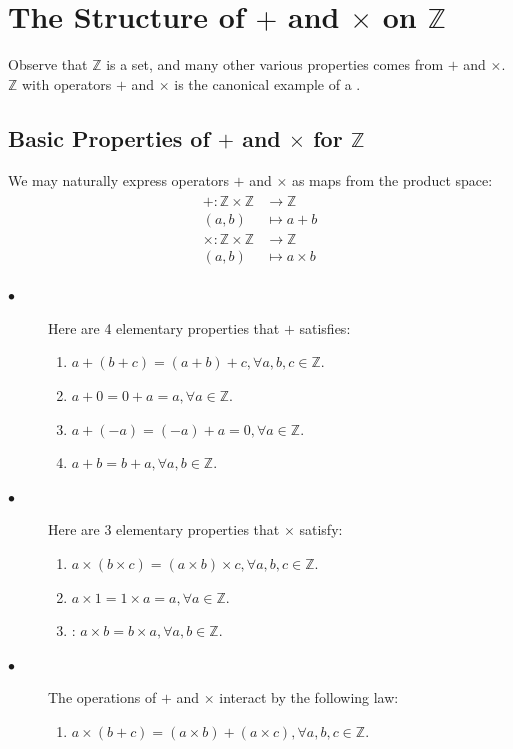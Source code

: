 \documentclass{article}
\begin{document}
\section{The Structure of $+$ and $\times$ on $\mathbb{Z}$}
Observe that $\mathbb{Z}$ is a set, and many other various properties comes from  $+$ and $\times$. $\mathbb{Z}$ with  operators $+$ and $\times$ is the canonical example of a . 
\subsection{Basic Properties of  $+$ and $\times$ for  $\mathbb{Z}$}
We may naturally express operators $+$ and $\times$ as maps from the product space:
\begin{align*}
\begin{aligned}
+: \mathbb{Z} \times \mathbb{Z} & \rightarrow \mathbb{Z} \\
(a, b) & \mapsto a+b \\
\times: \mathbb{Z} \times \mathbb{Z} & \rightarrow \mathbb{Z} \\
(a, b) & \mapsto a \times b
\end{aligned}
\end{align*}
\begin{description}
  \item[$\bullet$] Here are 4 elementary properties that $+$ satisfies:

\begin{enumerate}
    \item {} $a+(b+c)=(a+b)+c, \forall a, b, c \in \mathbb{Z}$.
    \item {} $a+0=0+a=a, \forall a \in \mathbb{Z}$.
    \item {} $a+(-a)=(-a)+a=0, \forall a \in \mathbb{Z}$.
    \item  {} $a+b=b+a, \forall a, b \in \mathbb{Z}$.
\end{enumerate}
  \item[$\bullet$]  Here are 3 elementary properties that $\times$ satisfy:

\begin{enumerate}
    \item {} $a \times(b \times c)=(a \times b) \times c, \forall a, b, c \in \mathbb{Z}$.
    \item {} $a \times 1=1 \times a=a, \forall a \in \mathbb{Z}$.
    \item  {}: $a \times b=b \times a, \forall a, b \in \mathbb{Z} .$ 
\end{enumerate}
  \item[$\bullet$] The operations of $+$ and $\times$ interact by the following law:
\begin{enumerate}
    \item {} $a \times(b+c)=(a \times b)+(a \times c), \forall a, b, c \in \mathbb{Z}$.
\end{enumerate}
\end{description}
 
\end{document}
